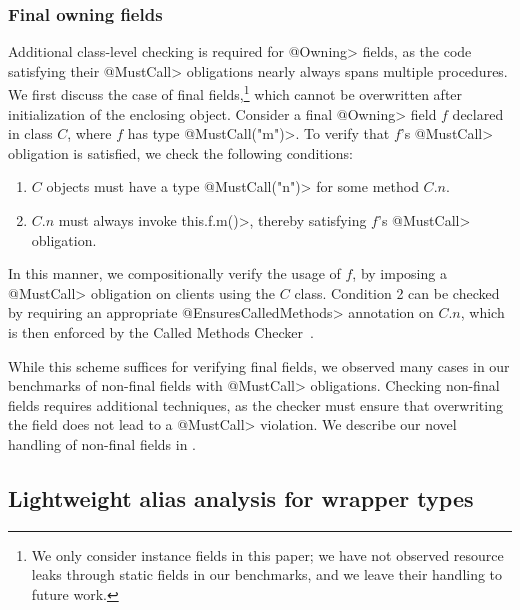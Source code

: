 
\subsubsection{Final owning fields}
\label{sec:owning-fields}


  Additional class-level checking is required for \<@Owning> fields, as the code
  satisfying their \<@MustCall> obligations nearly always spans multiple
  procedures.  We first discuss the case of final fields,\footnote{We only
  consider instance fields in this paper; we have not observed resource leaks
  through static fields in our benchmarks, and we leave their handling to future
  work.} which cannot be overwritten after initialization of the enclosing
  object.  Consider a final \<@Owning> field $f$ declared in class $C$, where
  $f$ has type \<@MustCall("m")>.  To
  verify that $f$'s \<@MustCall> obligation is satisfied, we check the following
  conditions:
  \begin{enumerate}
    \item $C$ objects must have a type \<@MustCall("n")> for some method $C.n$.
    \item $C.n$ must always invoke \<this.f.m()>, thereby satisfying $f$'s
    \<@MustCall> obligation.
  \end{enumerate}
  In this manner, we compositionally verify the usage of $f$, by imposing
  a \<@MustCall> obligation on clients using the $C$ class.  Condition 2 can be
  checked by requiring an appropriate \<@EnsuresCalledMethods> annotation on
  $C.n$, which is then enforced by the Called Methods
  Checker~\cite{kellogg20verifying}.  

  While this scheme suffices for verifying final fields, we observed many cases
  in our benchmarks of non-final fields with \<@MustCall> obligations.  Checking
  non-final fields requires additional techniques, as the checker must ensure
  that overwriting the field does not lead to a \<@MustCall> violation.  We
  describe our novel handling of non-final fields in .

\subsection{Lightweight alias analysis for wrapper types}
\label{sec:must-call-choice}


